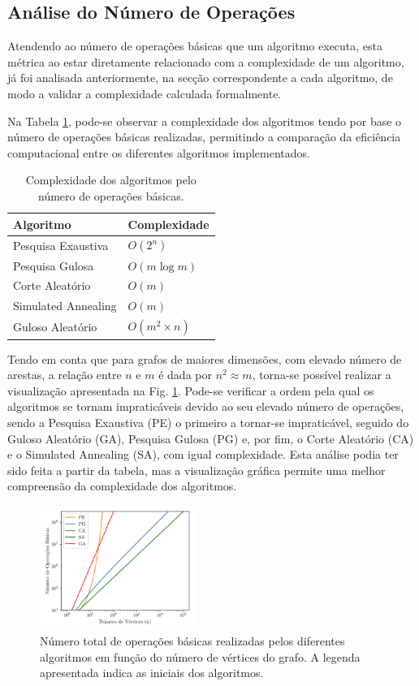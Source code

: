 \documentclass[mirror, portugues]{revdetua}
\begin{document}
\subsection{Análise do Número de Operações}

Atendendo ao número de operações básicas que um algoritmo executa, esta métrica ao estar diretamente relacionado com a complexidade de um algoritmo, já foi analisada anteriormente, na secção correspondente a cada algoritmo, de modo a validar a complexidade calculada formalmente.

Na Tabela \ref{table:numops}, pode-se observar a complexidade dos algoritmos tendo por base o número de operações básicas realizadas, permitindo a comparação da eficiência computacional entre os diferentes algoritmos implementados.

\begin{table}[H]
\centering
\caption{Complexidade dos algoritmos pelo número de operações básicas.}
\label{table:numops}
\begin{tabular}{ll}
\toprule
\textbf{Algoritmo} & \textbf{Complexidade} \\
\midrule
Pesquisa Exaustiva & $O(2^n)$ \\
Pesquisa Gulosa & $O(m \log m)$ \\
Corte Aleatório & $O(m)$ \\
Simulated Annealing & $O(m)$ \\
Guloso Aleatório & $O(m^2 \times n)$ \\
\bottomrule
\end{tabular}
\end{table}

Tendo em conta que para grafos de maiores dimensões, com elevado número de arestas, a relação entre $n$ e $m$ é dada por $n^2 \approx m$, torna-se possível realizar a visualização apresentada na Fig. \ref{fig:total_ops_per_alg}. Pode-se verificar a ordem pela qual os algoritmos se tornam impraticáveis devido ao seu elevado número de operações, sendo a Pesquisa Exaustiva (PE) o primeiro a tornar-se impraticável, seguido do Guloso Aleatório (GA), Pesquisa Gulosa (PG) e, por fim, o Corte Aleatório (CA) e o Simulated Annealing (SA), com igual complexidade. Esta análise podia ter sido feita a partir da tabela, mas a visualização gráfica permite uma melhor compreensão da complexidade dos algoritmos.

\begin{figure}[H]
    \centering
    \includegraphics[width=0.45\textwidth]{../assets/basicops.png}
    \caption{Número total de operações básicas realizadas pelos diferentes algoritmos em função do número de vértices do grafo. A legenda apresentada indica as iniciais dos algoritmos.}
    \label{fig:total_ops_per_alg}
\end{figure}
\end{document}
